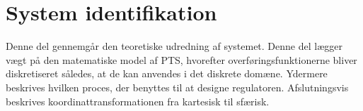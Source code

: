 \part{System identifikation}
Denne del gennemgår den teoretiske udredning af systemet. 
Denne del lægger vægt på den matematiske model af PTS, hvorefter overføringsfunktionerne bliver diskretiseret således, at de kan anvendes i det diskrete domæne. 
Ydermere beskrives hvilken proces, der benyttes til at designe regulatoren.
Afslutningsvis beskrives koordinattransformationen fra kartesisk til sfærisk.




